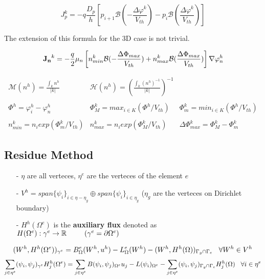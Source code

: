 \begin{equation}
\label{eq: scharfetter gummel 1D hole}
J_p^k=-q\frac{D_p}{h}
\left[ p_{i+1}\mathcal{B}\left(-\frac{\Delta \varphi^k}{V_{th}}\right)- p_i\mathcal{B}\left(\frac{\Delta \varphi^k}{V_{th}}\right)\right] 
\end{equation} 


The extension of this formula for the 3D case is not trivial.

\begin{equation}
\mathbf{J_n}^k=-\frac{q}{2}\mu_n
\left[ n_{min}^k\mathcal{B}(-\frac{\Delta \Phi_{max}}{V_{th}})+ n_{max}^k\mathcal{B}(\frac{\Delta \Phi_{max}}{V_{th}})\right]\nabla \varphi_n^h
\end{equation}


\begin{equation*}
\begin{array}{lll}
\mathcal{M}(n^h)=\frac{\int_kn^h}{|k|} &
\mathcal{H}(n^h)=\left(\frac{\int_k(n^h)^{-1}}{|k|} \right) ^{-1} \\ \\
\Phi^h=\varphi_i^h-\varphi_n^h &
\Phi_M^k =  max_{i\in K} (\Phi^h/V_{th}) & \Phi_m^k = min_{i\in K}(\Phi^h/V_{th}) \\ \\ 
n_{min}^k=n_iexp(\Phi_m^k/V_{th}) & 
n_{max}^k=n_iexp(\Phi_M^k/V_{th}) & \Delta \Phi_{max}^k = \Phi_M^k - \Phi_m^k
\end{array}
\end{equation*}

\subsection{Residue Method}

\begin{itemize}
\item[-] $\eta$ are all verteces, $\eta^e$ are the verteces of the element $e$
\item[-] $V^h=span\{\psi_i\}_{i\in \eta-\eta_g}\oplus span\{\psi_i\}_{i\in \eta_g}$  ($\eta_g$ are the verteces on Dirichlet boundary)
\item[-] $H^h(\Omega^e)$ is the \textbf{auxiliary flux} denoted as $H(\Omega^e):\gamma^e\rightarrow\mathbb{R} \psp{15}(\gamma^e=\partial \Omega^e)$
\end{itemize}

\begin{equation*}
(W^h,H^h(\Omega^e))_{\gamma^e}=B_\Omega^e(W^h,u^h)-L_\Omega^e(W^h)-(W^h,H^h(\Omega))_{\Gamma_g\cap\Gamma_e} \psp{5} \forall W^h\in V^h
\end{equation*}
\begin{equation*}
\sum_{j\in \eta^e} (\psi_i,\psi_j)_{\gamma^e}H^h_j(\Omega^e)=\sum_{j\in \eta^e}B(\psi_i,\psi_j)_{\Omega^e}u_j-L(\psi_i)_{\Omega^e}-\sum_{j\in \eta^e}(\psi_i,\psi_j)_{\Gamma_g\cap\Gamma_e}H_j^h(\Omega) \psp{5} \forall i \in \eta^e
\end{equation*}

